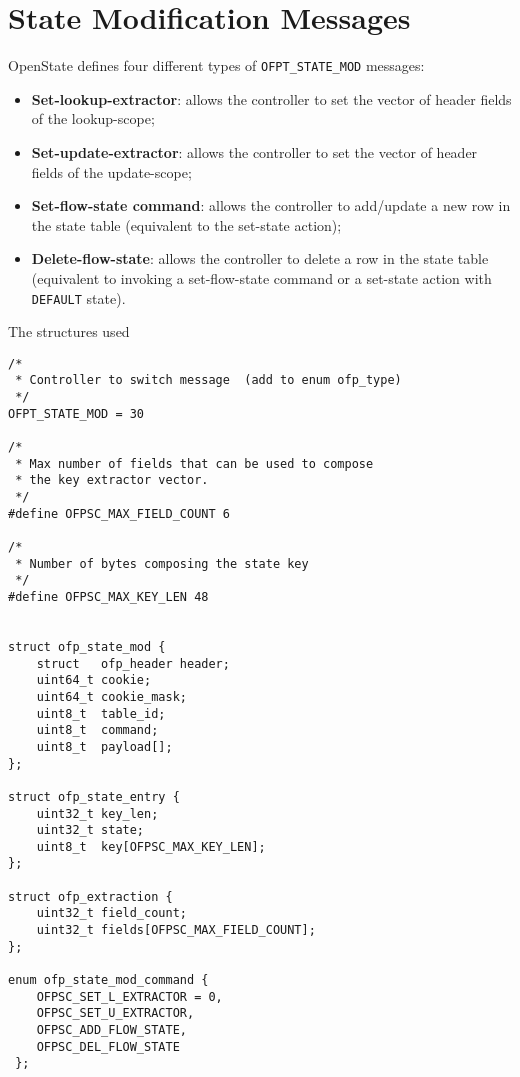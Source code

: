 \section{State Modification Messages}
\label{sec:msg_set_state}

OpenState defines four different types of \texttt{OFPT\_STATE\_MOD} messages: 
\begin{itemize}
\setlength\itemsep{0em}
\item \textbf{Set-lookup-extractor}: allows the controller to set the vector of header fields of the lookup-scope;
\item \textbf{Set-update-extractor}: allows the controller to set the vector of header fields of the update-scope;
\item \textbf{Set-flow-state command}: allows the controller to add/update a new row in the state table (equivalent to the set-state action);
\item \textbf{Delete-flow-state}: allows the controller to delete a row in the state table (equivalent to invoking a  set-flow-state command or a set-state action with \texttt{DEFAULT} state).
\end{itemize}

The structures used

\begin{verbatim}
/*
 * Controller to switch message  (add to enum ofp_type)
 */
OFPT_STATE_MOD = 30

/*
 * Max number of fields that can be used to compose
 * the key extractor vector.
 */
#define OFPSC_MAX_FIELD_COUNT 6

/*
 * Number of bytes composing the state key
 */
#define OFPSC_MAX_KEY_LEN 48


struct ofp_state_mod {
    struct   ofp_header header;
    uint64_t cookie;
    uint64_t cookie_mask;
    uint8_t  table_id;
    uint8_t  command;
    uint8_t  payload[];
};

struct ofp_state_entry {
    uint32_t key_len;
    uint32_t state;
    uint8_t  key[OFPSC_MAX_KEY_LEN];
};

struct ofp_extraction {
    uint32_t field_count;
    uint32_t fields[OFPSC_MAX_FIELD_COUNT];
};

enum ofp_state_mod_command {
	OFPSC_SET_L_EXTRACTOR = 0,
	OFPSC_SET_U_EXTRACTOR,
	OFPSC_ADD_FLOW_STATE,	
	OFPSC_DEL_FLOW_STATE
 };

\end{verbatim}


